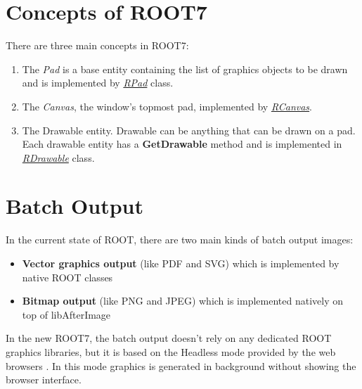 \documentclass[a4paper]{jpconf}
\begin{document}
\section{Concepts of ROOT7}
There are three main concepts in ROOT7:
\begin{enumerate}[label=\alph*)]
  \item The \textit{Pad} is a base entity containing the list of graphics objects to be drawn and is implemented by \textit{\href{https://root.cern.ch/doc/master/classROOT_1_1Experimental_1_1RPad.html}{RPad}} class.
  \item The \textit{Canvas}, the window's topmost pad, implemented by \textit{\href{https://root.cern.ch/doc/master/classROOT_1_1Experimental_1_1RCanvas.html}{RCanvas}}.
  \item The Drawable entity. Drawable can be anything that can be drawn on a pad. Each drawable entity has a \textbf{GetDrawable} method and is implemented in \textit{\href{https://root.cern.ch/doc/master/classROOT_1_1Experimental_1_1RDrawable.html}{RDrawable}} class.
\end{enumerate}


\section{Batch Output}
In the current state of ROOT, there are two main kinds of batch output images:
\begin{itemize}
  \item \textbf{Vector graphics output} (like PDF and SVG) which is implemented by native ROOT classes
  \item \textbf{Bitmap output} (like PNG and JPEG) which is implemented natively on top of libAfterImage
\end{itemize}

\noindent
In the new ROOT7,  the batch output doesn't rely on any dedicated ROOT graphics
libraries, but it is based on the \textit{}{Headless mode} provided by the web
browsers . In this mode graphics is generated in background without showing
the browser interface.
\end{document}

